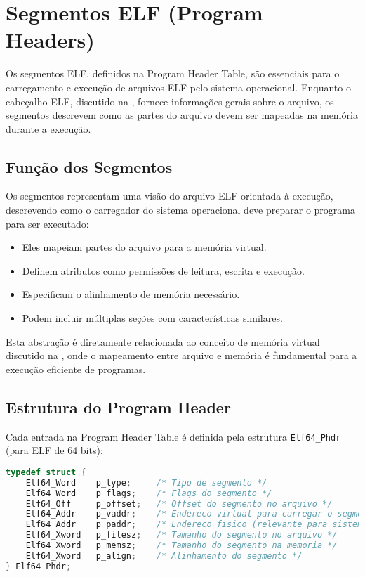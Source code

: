 \section{Segmentos ELF (Program Headers)}\label{sec:elf_segments}

Os segmentos ELF, definidos na Program Header Table, são essenciais para o carregamento e execução de arquivos ELF pelo sistema operacional. Enquanto o cabeçalho ELF, discutido na , fornece informações gerais sobre o arquivo, os segmentos descrevem como as partes do arquivo devem ser mapeadas na memória durante a execução.

\subsection{Função dos Segmentos}\label{subsec:segment_function}

Os segmentos representam uma visão do arquivo ELF orientada à execução, descrevendo como o carregador do sistema operacional deve preparar o programa para ser executado:

\begin{itemize}
    \item Eles mapeiam partes do arquivo para a memória virtual.
    \item Definem atributos como permissões de leitura, escrita e execução.
    \item Especificam o alinhamento de memória necessário.
    \item Podem incluir múltiplas seções com características similares.
\end{itemize}

Esta abstração é diretamente relacionada ao conceito de memória virtual discutido na , onde o mapeamento entre arquivo e memória é fundamental para a execução eficiente de programas.

\subsection{Estrutura do Program Header}\label{subsec:program_header_structure}

Cada entrada na Program Header Table é definida pela estrutura \texttt{Elf64\_Phdr} (para ELF de 64 bits):

\begin{lstlisting}[language=C, caption={Estrutura do Program Header de 64 bits}, label={lst:elf64_phdr}]
typedef struct {
    Elf64_Word    p_type;     /* Tipo de segmento */
    Elf64_Word    p_flags;    /* Flags do segmento */
    Elf64_Off     p_offset;   /* Offset do segmento no arquivo */
    Elf64_Addr    p_vaddr;    /* Endereco virtual para carregar o segmento */
    Elf64_Addr    p_paddr;    /* Endereco fisico (relevante para sistemas embarcados) */
    Elf64_Xword   p_filesz;   /* Tamanho do segmento no arquivo */
    Elf64_Xword   p_memsz;    /* Tamanho do segmento na memoria */
    Elf64_Xword   p_align;    /* Alinhamento do segmento */
} Elf64_Phdr;
\end{lstlisting}

